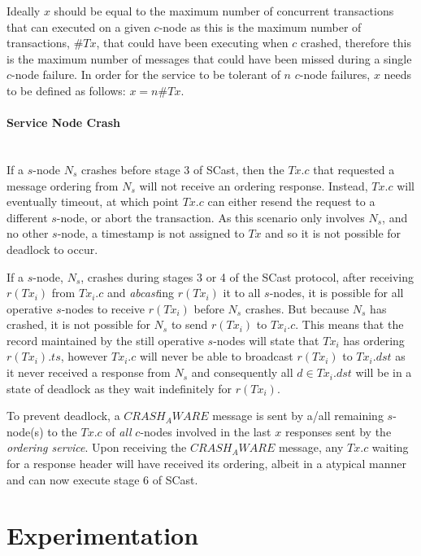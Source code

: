 	Ideally $x$ should be equal to the maximum number of concurrent transactions that can executed on a given $c$-node as this is the maximum number of transactions, $\#Tx$, that could have been executing when $c$ crashed, therefore this is the maximum number of messages that could have been missed during a single $c$-node failure.  In order for the service to be tolerant of $n$ $c$-node failures, $x$ needs to be defined as follows: $x = n\#Tx$.  
	    
	\paragraph{Service Node Crash} \hspace{0pt} \\
	If a $s$-node $N_s$ crashes before stage 3 of \textsf{SCast}, then the $Tx.c$ that requested a message ordering from $N_s$ will not receive an ordering response.  Instead, $Tx.c$ will eventually timeout, at which point $Tx.c$ can either resend the request to a different $s$-node, or abort the transaction.  As this scenario only involves $N_s$, and no other $s$-node, a timestamp is not assigned to $Tx$ and so it is not possible for deadlock to occur.  
	
	If a $s$-node, $N_s$, crashes during stages 3 or 4 of the \textsf{SCast} protocol, after receiving $r(Tx_i)$ from $Tx_i.c$ and \emph{abcast}ing $r(Tx_i)$ it to all $s$-nodes, it is possible for all operative $s$-nodes to receive $r(Tx_i)$ before $N_s$ crashes.  But because $N_s$ has crashed, it is not possible for $N_s$ to send $r(Tx_i)$ to $Tx_i.c$.  This means that the record maintained by the still operative $s$-nodes will state that $Tx_i$ has ordering $r(Tx_i).ts$, however $Tx_i.c$ will never be able to broadcast $r(Tx_i)$ to $Tx_i.dst$ as it never received a response from $N_s$ and consequently all $d \in Tx_i.dst$ will be in a state of deadlock as they wait indefinitely for $r(Tx_i)$.  
	
	To prevent deadlock, a $CRASH_AWARE$ message is sent by a/all remaining $s$-node(s) to the $Tx.c$ of \emph{all} $c$-nodes involved in the last $x$ responses sent by the \emph{ordering service}.  Upon receiving the $CRASH_AWARE$ message, any $Tx.c$ waiting for a response header will have received its ordering, albeit in a atypical manner and can now execute stage 6 of \textsf{SCast}.  
	
\section{Experimentation}

